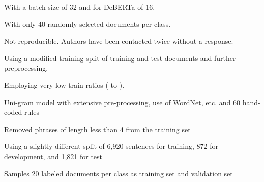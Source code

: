 \documentclass[runningheads]{llncs}
\begin{document}
\begin{table*}[!ht]
\begin{threeparttable}
        \begin{tablenotes} 
            \item[] With a batch size of 32 and for DeBERTa of 16.
            \item[] With only 40 randomly selected documents per class.
            \item[]Not reproducible. Authors have been contacted twice without a response.
            \item[] Using a modified training split of  training and  test documents and further preprocessing.
            \item[] Employing very low train ratios ( to ).
            \item[] Uni-gram model with extensive pre-processing, use of WordNet, etc. and 60 hand-coded rules
            \item[] Removed phrases of length less than 4 from the training set
            \item[] Using a slightly different split of 6,920 sentences for training, 872 for development, and 1,821 for test
            \item[] Samples 20 labeled documents per class as training set and validation set
        \end{tablenotes}
    \end{threeparttable}
\end{table*}
\end{document}
